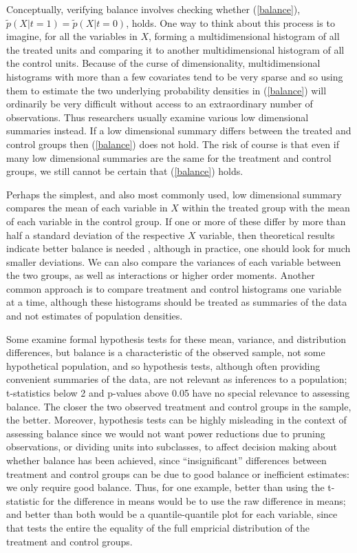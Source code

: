 \documentclass[11pt,titlepage]{article}
\begin{document}
Conceptually, verifying balance involves checking whether
(\ref{balance}), $\tilde p(X|t=1)=\tilde p(X|t=0)$, holds.  One way to
think about this process is to imagine, for all the variables in $X$,
forming a multidimensional histogram of all the treated units and
comparing it to another multidimensional histogram of all the control
units.  Because of the curse of dimensionality, multidimensional
histograms with more than a few covariates tend to be very sparse and
so using them to estimate the two underlying probability densities in
(\ref{balance}) will ordinarily be very difficult without access to an
extraordinary number of observations.  Thus researchers usually
examine various low dimensional summaries instead.  If a low
dimensional summary differs between the treated and control groups
then (\ref{balance}) does not hold.  The risk of course is that even
if many low dimensional summaries are the same for the treatment and
control groups, we still cannot be certain that (\ref{balance}) holds.

Perhaps the simplest, and also most commonly used, low dimensional
summary compares the mean of each variable in $X$ within the treated
group with the mean of each variable in the control group.  If one or
more of these differ by more than half a standard deviation of the
respective $X$ variable, then theoretical results indicate better
balance is needed \citep{Cochran68}, although in practice, one should
look for much smaller deviations.  We can also compare the variances
of each variable between the two groups, as well as interactions or
higher order moments.  Another common approach is to compare treatment
and control histograms one variable at a time, although these
histograms should be treated as summaries of the data and not
estimates of population densities.

Some examine formal hypothesis tests for these mean, variance, and
distribution differences, but balance is a characteristic of the
observed sample, not some hypothetical population, and so hypothesis
tests, although often providing convenient summaries of the data, are
not relevant as inferences to a population; t-statistics below 2 and
p-values above 0.05 have no special relevance to assessing balance.
The closer the two observed treatment and control groups in the
sample, the better.  Moreover, hypothesis tests can be highly
misleading in the context of assessing balance since we would not want
power reductions due to pruning observations, or dividing units into
subclasses, to affect decision making about whether balance has been
achieved, since ``insignificant'' differences between treatment and
control groups can be due to good balance or inefficient estimates: we
only require good balance.  Thus, for one example, better than using
the t-statistic for the difference in means would be to use the raw
difference in means; and better than both would be a quantile-quantile
plot for each variable, since that tests the entire the equality of
the full empricial distribution of the treatment and control groups.
\end{document}
